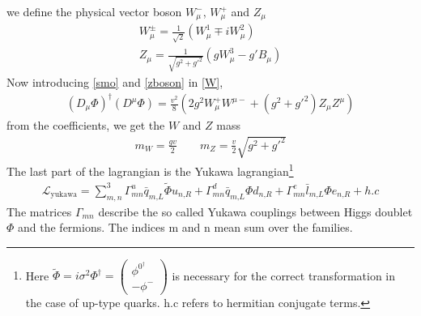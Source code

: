 we define the physical vector boson $W^-_\mu$, $W^+_\mu$ and $Z_\mu$ 
\begin{align} 
W^{\pm}_\mu=\frac{1}{\sqrt{2}} (W^1_\mu \mp iW^2_\mu) \label{smo}\\ 
Z_\mu=\frac{1}{\sqrt{g^2+g'^2}}\left(gW^3_\mu -g'B_\mu  \right) \label{zboson}
\end{align}
 Now introducing \ref{smo} and \ref{zboson} in \ref{W},
\begin{align}
(D_\mu \Phi)^\dagger (D^\mu \Phi)=\frac{v^2}{8}\left(2g^2 W_\mu^+ W^{\mu-} + (g^2+g'^2)Z_\mu Z^\mu \right) 
\end{align}
from the coefficients, we get the $W$ and $Z$ mass 
\begin{align}
m_W=\frac{gv}{2} \qquad m_Z=\frac{v}{2}\sqrt{g^2+g'^2}
\end{align}
The last part of the lagrangian is the Yukawa lagrangian\footnote{Here $
	\tilde{\Phi}=i\sigma^2 \Phi^\dagger =\left(\begin{array}{c}
	\phi^{0^\dagger} \\
	-\phi^-
	\end{array} \right)
	$ is necessary for the correct transformation in the case of up-type quarks. 
	h.c refers to hermitian conjugate terms. } 
\begin{align}
\mathcal{L}_\text{yukawa}=\sum_{m,n}^{3}  \Gamma^u_{mn}\bar{q}_{m\text{,}L} \tilde{\Phi} u_{n\text{,}R}+\Gamma^d_{mn}\bar{q}_{m\text{,}L} \Phi d_{n\text{,}R}+\Gamma^e_{mn}\bar{l}_{m\text{,}L} \Phi e_{n\text{,}R}+h.c
\end{align}
The matrices $\Gamma_{mn}$ describe the so called Yukawa couplings between Higgs doublet $\Phi$ and the fermions. The indices m and n mean sum over the families. 
